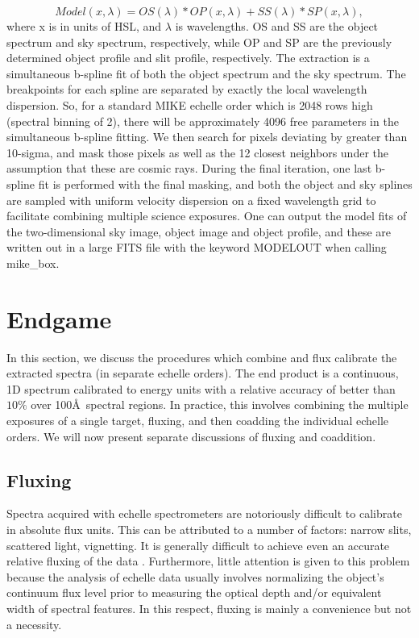 \documentclass[12pt,preprint]{aastex}
\begin{document}
\begin{equation}
Model(x,\lambda)= OS(\lambda) * OP(x,\lambda)+ SS(\lambda) * SP(x,\lambda),
\end{equation}
where x is in units of HSL, and $\lambda$ is wavelengths.  OS and SS are the
object spectrum and sky spectrum, respectively, while OP and SP are the 
previously determined object profile and slit profile, respectively.
The extraction is a simultaneous b-spline fit of both the object spectrum and
the sky spectrum.  The breakpoints for each spline are separated by exactly
the local wavelength dispersion.  So, for a standard MIKE echelle order
which is 2048 rows high (spectral binning of 2), there will be approximately
4096 free parameters in the simultaneous b-spline fitting.  
We then search for pixels deviating by greater than 10-sigma, and mask those
pixels as well as the 12 closest neighbors
under the assumption that these are cosmic rays.
During the final iteration, one last b-spline fit is performed with the final
masking, and both the object and sky splines are sampled with uniform 
velocity dispersion on a fixed wavelength grid to facilitate 
combining multiple science exposures.  One can output
the model fits of the two-dimensional sky image,
 object image and object profile, and these are
written out in a large FITS file with the keyword MODELOUT
when calling mike\_box.

 
\section{Endgame}

In this section, we discuss the procedures which combine and 
flux calibrate the extracted spectra (in separate echelle orders).
The end product is a continuous, 1D spectrum calibrated to 
energy units with a relative accuracy of better than $10\%$ over
100\AA\ spectral regions.
In practice, this involves combining the 
multiple exposures of a single target, fluxing, and then 
coadding the individual echelle orders.  We will now present separate
discussions of fluxing and coaddition.

\subsection{Fluxing}

Spectra acquired with echelle spectrometers are notoriously
difficult to calibrate in absolute flux units.
This can be attributed to a number of factors:  narrow slits,
scattered light, vignetting.
It is generally difficult to achieve even
an accurate relative fluxing of the data \citep[e.g.][]{dh,elp+99,suzuki}.
Furthermore, little attention is given to this problem
because the analysis of echelle data usually involves
normalizing the object's continuum flux level prior
to measuring the optical depth and/or equivalent width of spectral
features.  In this respect, fluxing is mainly a convenience but
not a necessity.
\end{document}

